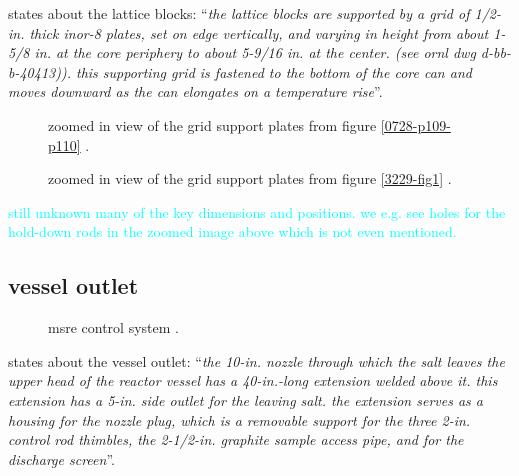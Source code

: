 \documentclass{article}
\begin{document}
\begin{preview}
\parencite[page 81]{ornl-tm-0728} states about the lattice blocks: \enquote{\textit{the lattice blocks are supported by a grid of 1/2-in. thick inor-8 plates, set on edge vertically, and varying in height from about 1-5/8 in. at the core periphery to about 5-9/16 in. at the center. (see ornl dwg d-bb-b-40413)). this supporting grid is fastened to the bottom of the core can and moves downward as the can elongates on a temperature rise}}.

\begin{figure}[H]
  \centering
  \caption{zoomed in view of the grid support plates from figure \ref{0728-p109-p110} \parencite[page 110]{ornl-tm-0728}.}
\end{figure}

\begin{figure}[H]
  \centering
  \caption{zoomed in view of the grid support plates from figure \ref{3229-fig1} \parencite[figure 1]{ornl-tm-3229}.}
\end{figure}

\textcolor{cyan}{still unknown many of the key dimensions and positions. we e.g. see holes for the hold-down rods in the zoomed image above which is not even mentioned.}


\subsection{vessel outlet}

\begin{figure}[H]
  \centering
  \caption{msre control system \parencite[figure 14c]{ad-cf-61-2-46}.}
  \label{61246-fig14c}
\end{figure}

\parencite[page 104]{ornl-tm-0728} states about the vessel outlet: \enquote{\textit{the 10-in. nozzle through which the salt leaves the upper head of the reactor vessel has a 40-in.-long extension welded above it. this extension has a 5-in. side outlet for the leaving salt. the extension serves as a housing for the nozzle plug, which is a removable support for the three 2-in. control rod thimbles, the 2-1/2-in. graphite sample access pipe, and for the discharge screen}}.



\end{preview}
\end{document}
